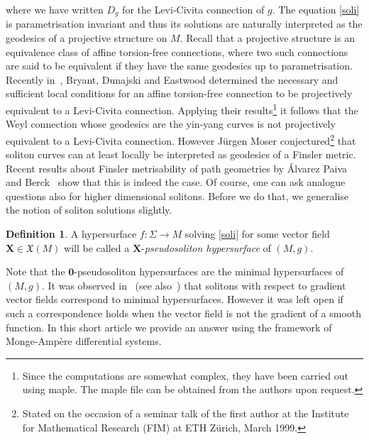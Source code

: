\documentclass[11pt,letterpaper]{amsart}
\theoremstyle{definition}
\newtheorem*{definition}{Definition}
\numberwithin{equation}{section}
\begin{document}
where we have written $D_g$ for the Levi-Civita connection of $g$. The equation \eqref{soli} is parametrisation invariant and thus its solutions are naturally interpreted as the geodesics of a projective structure on $M$. Recall that a projective structure is an equivalence class of affine torsion-free connections, where two such connections are said to be equivalent if they have the same geodesics up to parametrisation. Recently in~\cite{MR2581355}, Bryant, Dunajski and Eastwood determined the necessary and sufficient local conditions for an affine torsion-free connection to be projectively equivalent to a Levi-Civita connection. Applying their results\footnote{Since the computations are somewhat complex, they have been carried out using maple. The maple file can be obtained from the authors upon request.} it follows that the Weyl connection whose geodesics are the yin-yang curves is not projectively equivalent to a Levi-Civita connection. However J\"urgen  Moser conjectured\footnote{Stated on the occasion of a seminar talk of the first author
at  the Institute  for Mathematical  Research (FIM)  at  ETH Z\"urich,
March 1999.} that  soliton  curves  can  at least  locally be  interpreted  as
geodesics of a Finsler metric.  Recent results about Finsler metrisability of path geometries by 
\'Alvarez  Paiva   and  Berck~\cite{alvarezberckfinslermetri} show that this is indeed the case. Of
course,  one can ask  analogue questions  also for  higher dimensional
solitons.   Before we  do that,  we generalise  the notion  of soliton
solutions slightly.
\begin{definition}
A hypersurface $f : \Sigma \to M$ solving \eqref{soli} for some vector field ${\mathbf{X}} \in \mathfrak{X}(M)$ will be called a ${\mathbf{X}}$-\textit{pseudosoliton hypersurface} of $(M,g)$.
\end{definition} Note that the ${\mathbf{0}}$-pseudosoliton hypersurfaces are the minimal hypersurfaces of $(M,g)$. It was observed in~\cite{MR1855161} (see also~\cite{MR1030675}) that solitons with respect to gradient vector fields correspond to minimal hypersurfaces. However it was left open if such a correspondence holds when the vector field is not the gradient of a smooth function. In this short article we provide an answer using the framework of {Monge-Amp\`ere } differential systems. 
\end{document}
